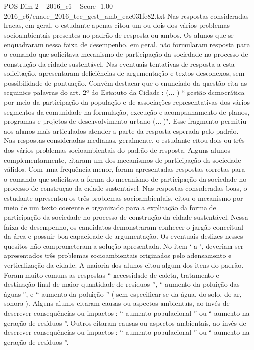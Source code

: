 \begin{textsample}{POS Dim 2 – 2016\_c6 – Score -1.00 – 2016\_c6/enade\_2016\_tec\_gest\_amb\_eac031fe82.txt}
Nas respostas consideradas fracas, em geral, o estudante apenas citou um ou dois dos vários problemas socioambientais presentes no padrão de resposta ou ambos.
Os alunos que se enquadraram nessa faixa de desempenho, em geral, não formularam resposta para o comando que solicitava mecanismo de participação da sociedade no processo de construção da cidade sustentável.
Nas eventuais tentativas de resposta a esta solicitação, apresentaram deficiências de argumentação e textos desconexos, sem possibilidade de pontuação.
Convém destacar que o enunciado da questão cita as seguintes palavras do art. 2º do Estatuto da Cidade : (... ) “ gestão democrática por meio da participação da população e de associações representativas dos vários segmentos da comunidade na formulação, execução e acompanhamento de planos, programas e projetos de desenvolvimento urbano (... )".
Esse fragmento permitiu aos alunos mais articulados atender a parte da resposta esperada pelo padrão.
Nas respostas consideradas medianas, geralmente, o estudante citou dois ou três dos vários problemas socioambientais do padrão de resposta.
Alguns alunos, complementarmente, citaram um dos mecanismos de participação da sociedade válidos.
Com uma frequência menor, foram apresentadas respostas corretas para o comando que solicitava a forma do mecanismo de participação da sociedade no processo de construção da cidade sustentável.
Nas respostas consideradas boas, o estudante apresentou os três problemas socioambientais, citou o mecanismo por meio de um texto coerente e organizado para a explicação da forma de participação da sociedade no processo de construção da cidade sustentável.
Nessa faixa de desempenho, os candidatos demonstraram conhecer o jargão conceitual da área e possuir boa capacidade de argumentação.
Os eventuais deslizes nesses quesitos não comprometeram a solução apresentada.
No item ‘ a ’, deveriam ser apresentados três problemas socioambientais originados pelo adensamento e verticalização da cidade.
A maioria dos alunos citou algum dos itens do padrão.
Foram muito comuns as respostas “ necessidade de coleta, tratamento e destinação final de maior quantidade de resíduos ”, “ aumento da poluição das águas ”, e “ aumento da poluição ” ( sem especificar se da água, do solo, do ar, sonora ).
Alguns alunos citaram causas ou aspectos ambientais, ao invés de descrever consequências ou impactos : “ aumento populacional ” ou “ aumento na geração de resíduos ”.
Outros citaram causas ou aspectos ambientais, ao invés de descrever consequências ou impactos : “ aumento populacional ” ou “ aumento na geração de resíduos ”.

\end{textsample}
